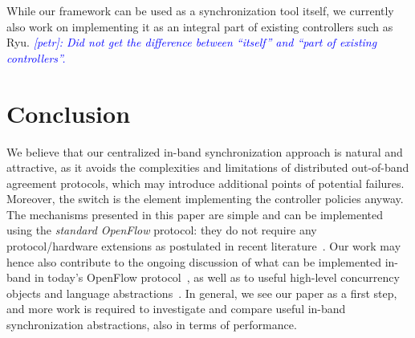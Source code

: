 \documentclass[conference]{sigcomm-alternate}
\newcommand{\petr}[1]{\textit{\textcolor{blue}{[petr]: #1}}} %
\begin{document}
 
While our framework can be used as a synchronization tool itself, we 
currently also work on implementing it as an integral part of existing controllers 
such as Ryu. 
\petr{Did not get the difference between ``itself'' and ``part of
  existing controllers''.} 


\section{Conclusion}\label{sec:conclusion}


We believe that our centralized in-band
synchronization approach is natural and attractive, as it avoids the
complexities and limitations of distributed out-of-band agreement protocols, which may 
introduce additional points of potential failures.
Moreover, the switch is the element implementing the controller policies anyway.
The mechanisms presented in this paper are simple and can be implemented using the \emph{standard OpenFlow}
protocol: they do not require any protocol/hardware extensions as postulated in recent literature~\cite{stn,netpaxos}.
Our work may hence also contribute to the ongoing discussion of what can be implemented
in-band in today's OpenFlow protocol~\cite{reclaim},
as well as to useful high-level concurrency objects and
language abstractions~\cite{pyretic}.
In general, we see our paper as a first step, and more
work is required to investigate and compare useful
in-band synchronization abstractions, also in terms of performance.

{

}
\end{document}
